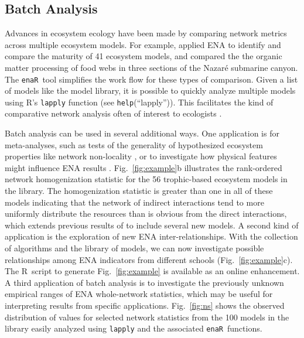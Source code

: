 \documentclass[11pt]{article}
\newcommand{\R}{R}
\newcommand{\enaR}{\texttt{enaR}}
\begin{document}
\begin{spacing}{2}
\subsection{Batch Analysis}
Advances in ecosystem ecology have been made by comparing network
metrics across multiple ecosystem models. For example,
\citet{christensen95} applied ENA to identify and compare the maturity
of 41 ecosystem models, and \citet{vanoevelen2011canyon} compared the
the organic matter processing of food webs in three sections of the
Nazar{\'e} submarine canyon.  The \enaR\ tool simplifies the work flow
for these types of comparison. Given a list of models like the model
library, it is possible to quickly analyze multiple models using R's
\texttt{lapply} function (see \texttt{help}(``lapply'')).  This
facilitates the kind of comparative network analysis often of interest
to ecologists \citep{monaco97,christian05_cnea, whipple07}.

Batch analysis can be used in several additional ways.  One
application is for meta-analyses, such as tests of the generality of
hypothesized ecosystem properties like network non-locality
\citep{salas11_did}, %
or to investigate how physical features might influence ENA results
\citep{niquil2012physical}. Fig.~\ref{fig:example}b illustrates the
rank-ordered network homogenization statistic for the 56 trophic-based
ecosystem models in the library. The homogenization
statistic is greater than one in all of these models indicating that
the network of indirect interactions tend to more uniformly distribute
the resources than is obvious from the direct interactions, which
extends previous results of \citet{borrett10_hmg} to include several
new models.  A second kind of application is the exploration of new
ENA inter-relationships.  With the collection of algorithms and the
library of models, we can now investigate possible relationships among
ENA indicators from different schools (Fig.~\ref{fig:example}c). The
\R\ script to generate Fig.~\ref{fig:example} is available as an
online enhancement.  A third application of batch analysis is to
investigate the previously unknown empirical ranges of ENA
whole-network statistics, which may be useful for interpreting results
from specific applications.  Fig.~\ref{fig:ns} shows the observed
distribution of values for selected network statistics from the 100
models in the library easily analyzed using \texttt{lapply} and the
associated \enaR\ functions.



\end{spacing}
\end{document}
